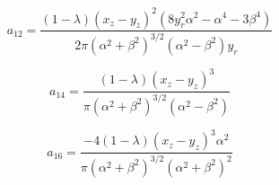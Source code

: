 \documentclass[12pt]{article}
\begin{document}
\begin{equation}
\label{equ:coeff_a12}
a_{12} = \frac{(1 - \lambda) (x_{z} - y_{z})^{2} (8 y_{r}^{2} \alpha^{2} - \alpha^{4} - 3 \beta^{4})}{2 \pi (\alpha^{2} + \beta^{2})^{3/2} (\alpha^{2} - \beta^{2}) y_{r}}
\end{equation}

\begin{equation}
\label{equ:coeff_a14}
a_{14} = \frac{(1 - \lambda) (x_{z} - y_{z})^{3}}{\pi (\alpha^{2} + \beta^{2})^{3/2} (\alpha^{2} - \beta^{2})}
\end{equation}

\begin{equation}
\label{equ:coeff_a16}
a_{16} = \frac{-4 (1 - \lambda) (x_{z} - y_{z})^{3} \alpha^{2}}{\pi (\alpha^{2} + \beta^{2})^{3/2} (\alpha^{2} + \beta^{2})^{2}}
\end{equation}




\end{document}
